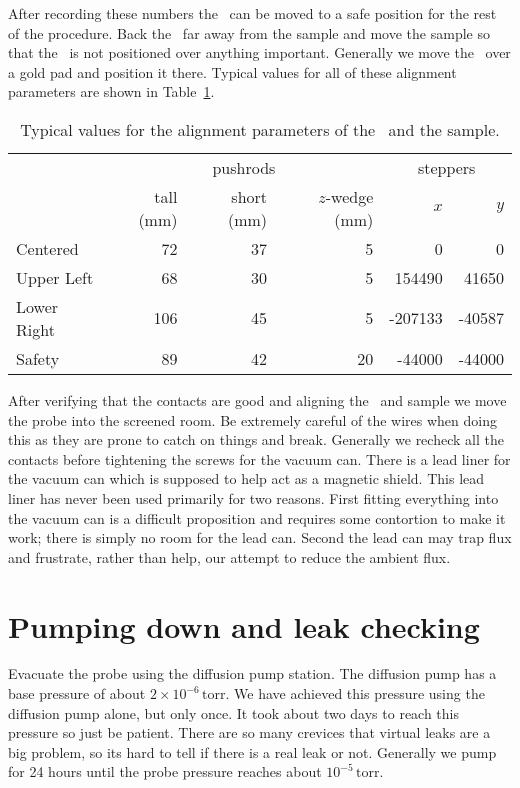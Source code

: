 After recording 
these numbers the \squid\ can be moved to a safe position for the
rest of the procedure. Back the \squid\ far away from the sample and 
move the sample so that the \squid\ is not positioned over anything important.
Generally we move the \squid\ over a gold pad and position it there. 
Typical values for all of these alignment parameters are shown in 
Table~\ref{alignprms:table}. 

\begin{table}
\begin{tabular}{l|rrr|rr}  
                &  \multicolumn{3}{c|}{pushrods} & \multicolumn{2}{c}{steppers} \\
                &     tall (mm) & short (mm) & $z$-wedge (mm) &  $x$ & $y$  \\ \hline    
 Centered       &   72          &   37       &  5           &  0 & 0 \\
 Upper Left     &   68          &   30       &  5           & 154490 & 41650 \\
 Lower Right    &   106         &   45       &  5           & -207133 & -40587 \\
 Safety         &   89          &   42       &  20          & -44000  & -44000 
 
\end{tabular}
\caption{Typical values for the alignment parameters of the \squid\
and the sample.}
\label{alignprms:table}
\end{table}

After verifying that the contacts are good and aligning the \squid\ and sample
we move
the probe into the screened room. Be extremely careful
of the wires when doing this as they are prone to catch on things and break.
Generally we recheck all the contacts before tightening the screws for the
vacuum can. 
There is a lead liner for the vacuum can which is supposed to help act as a
magnetic shield. This lead liner has never been used primarily 
for two reasons. First
fitting everything into the vacuum can is a 
difficult proposition and requires some contortion to make it work;
there is simply no room for the lead can. Second
the lead can may trap flux and frustrate, rather than help, our
attempt to reduce the ambient flux.

\section{Pumping down and leak checking}

Evacuate the probe using the diffusion pump station. 
The diffusion pump has a base pressure of about 
$2 \times 10^{-6}\,\mathrm{torr}$. 
We have achieved this pressure using the diffusion pump alone, but only
once. It took about two days to reach this pressure so just be patient. There
are so many crevices that virtual leaks are a big problem, so its hard
to tell if there is a real leak or not. Generally we pump for 24 hours until 
the
probe pressure reaches about $10^{-5}\,\mathrm{torr}$.

